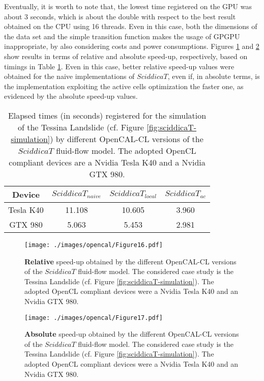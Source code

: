 Eventually, it is worth to note that, the lowest time registered
on the GPU was about 3 seconds, which is about the double with
respect to the best result obtained on the CPU using 16
threads. Even in this case, both the dimensions of the data set
and the simple transition function makes the usage of GPGPU
inappropriate, by also considering costs and power
consumptions. Figures \ref{gr:sciddicaT-CL-relative-speed-up} and
\ref{gr:sciddicaT-CL-absolute-speed-up} show results in terms of
relative and absolute speed-up, respectively, based on timings in
Table \ref{tab:sciddicaT-CL-execution-times}. Even in this case,
better relative speed-up values were obtained for the naive
implementations of $SciddicaT$, even if, in absolute terms, is the
implementation exploiting the active cells optimization the faster
one, as evidenced by the absolute speed-up values.

\begin{table}
	\centering
	\begin{tabular}{cccc}
		\hline Device & $SciddicaT_{naive}$ & $SciddicaT_{local}$ &
		$SciddicaT_{ac}$ \\ \hline Tesla K40 & 11.108 & 10.605 &
		3.960\\ GTX 980 & 5.063 & 5.453 & 2.981\\ \hline
	\end{tabular}
	\caption{Elapsed times (in seconds) registered for the simulation of the
		Tessina Landslide (cf. Figure \ref{fig:sciddicaT-simulation}) by
		different OpenCAL-CL versions of the $SciddicaT$ fluid-flow model. The
		adopted OpenCL compliant devices are a Nvidia Tesla K40 and a Nvidia
		GTX 980.}
	\label{tab:sciddicaT-CL-execution-times}
\end{table}

\begin{figure}
	\begin{center}
		\texttt{[image: ./images/opencal/Figure16.pdf]}
		\caption[\textbf{Relative} speed-up obtained by the different OpenCAL-CL versions of the
		$SciddicaT$ fluid-flow model.]{\textbf{Relative} speed-up obtained by the different OpenCAL-CL versions of the
			$SciddicaT$ fluid-flow model. The considered case study is the Tessina
			Landslide (cf. Figure \ref{fig:sciddicaT-simulation}). The adopted
			OpenCL compliant devices were a Nvidia Tesla K40 and an Nvidia GTX
			980.}
		\label{gr:sciddicaT-CL-relative-speed-up}
	\end{center}
\end{figure}
\begin{figure}
	\begin{center}
		\texttt{[image: ./images/opencal/Figure17.pdf]}
		\caption[\textbf{Absolute} speed-up obtained by the different OpenCAL-CL versions of the
		$SciddicaT$ fluid-flow model.]{\textbf{Absolute} speed-up obtained by the different OpenCAL-CL versions of the
			$SciddicaT$ fluid-flow model. The considered case study is the Tessina
			Landslide (cf. Figure \ref{fig:sciddicaT-simulation}). The adopted
			OpenCL compliant devices were a Nvidia Tesla K40 and an Nvidia GTX
			980.}
		\label{gr:sciddicaT-CL-absolute-speed-up}
	\end{center}
\end{figure}




